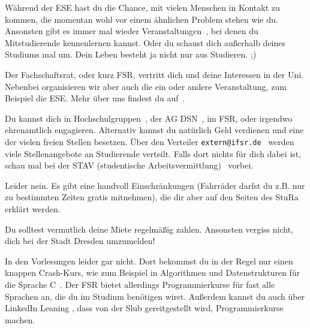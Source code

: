 Während der ESE hast du die Chance, mit vielen Menschen in Kontakt zu kommen, die momentan wohl vor einem ähnlichen Problem stehen wie du.
Ansonsten gibt es immer mal wieder Veranstaltungen~, bei denen du Mitstudierende kennenlernen kannst.
Oder du schaust dich außerhalb deines Studiums mal um. Dein Leben besteht ja nicht nur aus Studieren. ;)

Der Fachschaftsrat, oder kurz FSR, vertritt dich und deine Interessen in der Uni. Nebenbei organisieren wir aber auch die ein oder andere Veranstaltung, zum Beispiel die ESE. Mehr über uns findest du auf~.

Du kannst dich in Hochschulgruppen~, der AG DSN~, im FSR, oder irgendwo ehrenamtlich engagieren. Alternativ kannst du natürlich Geld verdienen und eine der vielen freien Stellen besetzen. Über den Verteiler \texttt{extern@ifsr.de}~ werden viele Stellenangebote an Studierende verteilt. Falls dort nichts für dich dabei ist, schau mal bei der STAV (studentische Arbeitsvermittlung)~ vorbei.

Leider nein. Es gibt eine handvoll Einschränkungen (Fahrräder darfst du z.B. nur zu bestimmten Zeiten gratis mitnehmen), die dir aber auf den Seiten des StuRa~ erklärt werden.

Du solltest vermutlich deine Miete regelmäßig zahlen. Ansonsten vergiss nicht, dich bei der Stadt Dresden umzumelden! 

In den Vorlesungen leider gar nicht. Dort bekommst du in der Regel nur einen knappen Crash-Kurs, wie zum Beispiel in Algorithmen und Datenstrukturen für die Sprache C~.
Der FSR bietet allerdings Programmierkurse für fast alle Sprachen an, die du im Studium benötigen wirst.  Außerdem kannst du auch über LinkedIn Leaning , dass von der Slub gereitgestellt wird, Programmierkurse machen.

